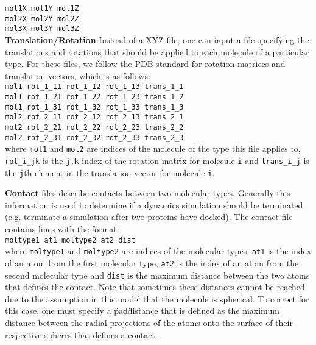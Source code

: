 \texttt{mol1X  mol1Y  mol1Z }\\
\texttt{mol2X  mol2Y  mol2Z }\\
\texttt{mol3X  mol3Y  mol3Z }\\


\textbf{Translation/Rotation} Instead of a XYZ file, one can input a file specifying the translations and rotations that should be applied to 
each molecule of a particular type. For these files, we follow the PDB standard for rotation matrices and translation vectors, 
which is as follows: \\

\texttt{mol1 rot\_1\_11 rot\_1\_12 rot\_1\_13 trans\_1\_1} \\
\texttt{mol1 rot\_1\_21 rot\_1\_22 rot\_1\_23 trans\_1\_2} \\
\texttt{mol1 rot\_1\_31 rot\_1\_32 rot\_1\_33 trans\_1\_3} \\
\texttt{mol2 rot\_2\_11 rot\_2\_12 rot\_2\_13 trans\_2\_1} \\
\texttt{mol2 rot\_2\_21 rot\_2\_22 rot\_2\_23 trans\_2\_2} \\
\texttt{mol2 rot\_2\_31 rot\_2\_32 rot\_2\_33 trans\_2\_3} \\

where \texttt{mol1} and \texttt{mol2} are indices of the molecule of the type this file applies to, \texttt{rot\_i\_jk} is the \texttt{j,k} index
of the rotation matrix for molecule \texttt{i} and \texttt{trans\_i\_j} is the \texttt{j}th element in the translation vector for molecule \texttt{i}.

\textbf{Contact} files describe contacts between two molecular types. Generally this information is used to determine if a dynamics 
simulation should be terminated (e.g. terminate a simulation after two proteins have docked). The contact file contains lines with the format: \\

\texttt{moltype1  at1 moltype2 at2 dist}\\

where \texttt{moltype1} and \texttt{moltype2} are indices of the molecular types, \texttt{at1} is the index of an atom from the first 
molecular type, \texttt{at2} is the index of an atom from the second molecular type and \texttt{dist} is the maximum distance between
the two atoms that defines the contact.  Note that sometimes these distances cannot be reached due to the assumption in this model that 
the molecule is spherical. To correct for this case, one must specify a \"pad\"  distance that is defined as the maximum distance between 
the radial projections of the atoms onto the surface of their respective spheres that defines a contact.

